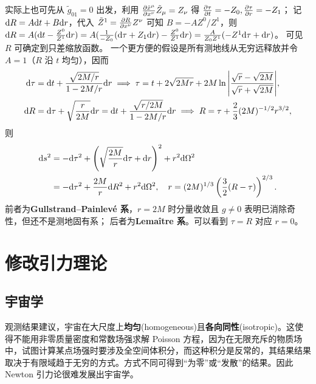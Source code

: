 实际上也可先从 $\tilde g_{01}=0$ 出发，利用 $\pdv{\tilde x^\mu}{x^\nu}\tilde Z_\mu=Z_\nu$ 得 $\pdv{\tau}{t}=-Z_0,\pdv{\tau}{r}=-Z_1$；
记 $\dd R=A\dd t+B\dd r$，代入 $\tilde Z^1=\pdv{R}{x^\nu}Z^\nu$ 可知 $B=-AZ^0/Z^1$，则 $\dd R=A(\dd t-\frac{Z^0}{Z^1}\dd r)=A(\frac{1}{-Z_0}(\dd\tau+Z_1\dd r)-\frac{Z^0}{Z^1}\dd r)=\frac{A}{Z_0Z^1}(-Z^1\dd\tau+\dd r)$。
可见 $R$ 可确定到只差缩放函数。
一个更方便的假设是所有测地线从无穷远释放并令 $A=1$（$R$ 沿 $t$ 均匀），因而
\begin{align}
    \dd\tau &= \dd t+\frac{\sqrt{2M/r}}{1-{2M}/{r}}\dd r\implies \tau = t+2 \sqrt{2Mr}+2M\ln\abs{\frac{\sqrt{r}-\sqrt{2M}}{\sqrt{r}+\sqrt{2M}}},\\
    \dd R &= \dd\tau+\sqrt{\frac{r}{2M}}\dd r = \dd t+\frac{\sqrt{r/2M}}{1-{2M}/{r}}\dd r\implies R=\tau+\frac 23(2M)^{-1/2}r^{3/2},
\end{align}
则
\begin{align}
    \dd s^2 &= -\dd\tau^2+\left(\sqrt{\frac{2M}{r}}\dd\tau+\dd r\right)^2+r^2\dd\Omega^2\\
    &= -\dd\tau^2+\frac{2M}{r}\dd R^2+r^2\dd\Omega^2,\quad r=(2M)^{1/3}\left(\frac 32(R-\tau)\right)^{2/3}.
\end{align}
前者为\textbf{Gullstrand–Painlevé 系}，$r=2M$ 时分量收敛且 $g\ne 0$ 表明已消除奇性，但还不是测地固有系； 
后者为\textbf{Lemaître 系}。可以看到 $\tau=R$ 对应 $r=0$。


\section{修改引力理论}
\subsection{宇宙学}
观测结果建议，宇宙在大尺度上\textbf{均匀}(homogeneous)且\textbf{各向同性}(isotropic)。这使得不能用非零质量密度和常数场强求解 Poisson 方程，因为在无限充斥的物质场中，试图计算某点场强时要涉及全空间体积分，而这种积分是反常的，其结果结果取决于有限域趋于无穷的方式。方式不同可得到“为零”或“发散”的结果。因此 Newton 引力论很难发展出宇宙学。

